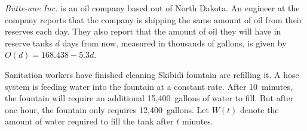 \documentclass[12pt,letterpaper]{exam}
\begin{document}
\begin{questions}



\newpage
\question \textit{Butte-ane Inc.} is an oil company based out of North Dakota. An engineer at the company reports that the company is shipping the same amount of oil from their reserves each day. They also report that the amount of oil they will have in reserve tanks $d$ days from now, measured in thousands of gallons, is given by $O(d)= 168.438 - 5.3d$. 



\newpage
\question Sanitation workers have finished cleaning Skibidi fountain are refilling it. A hose system is feeding water into the fountain at a constant rate. After 10~minutes, the fountain will require an additional 15,400~gallons of water to fill. But after one hour, the fountain only requires 12,400~gallons. Let $W(t)$ denote the amount of water required to fill the tank after $t$ minutes. 
\end{questions}
\end{document}
